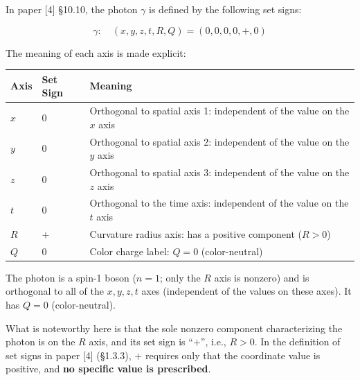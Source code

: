 \documentclass[
  a4paper,11pt]{article}
\newcounter{none}
\theoremstyle{definition}
\theoremstyle{remark}
\begin{document}
In paper {[}4{]} §10.10, the photon \(\gamma\) is defined by the
following set signs:

\[\gamma: \quad (x, y, z, t, R, Q) = (0, 0, 0, 0, +, 0)\]

The meaning of each axis is made explicit:

{\def\LTcaptype{none} %
\begin{longtable}[]{@{}
  >{\centering\arraybackslash}p{}
  >{\centering\arraybackslash}p{}
  >{\raggedright\arraybackslash}p{}@{}}
\toprule\noalign{}
\begin{minipage}[b]{\linewidth}\centering
Axis
\end{minipage} & \begin{minipage}[b]{\linewidth}\centering
Set Sign
\end{minipage} & \begin{minipage}[b]{\linewidth}\raggedright
Meaning
\end{minipage} \\
\midrule\noalign{}
\endhead
\bottomrule\noalign{}
\endlastfoot
\(x\) & \(0\) & Orthogonal to spatial axis 1: independent of the value
on the \(x\) axis \\
\(y\) & \(0\) & Orthogonal to spatial axis 2: independent of the value
on the \(y\) axis \\
\(z\) & \(0\) & Orthogonal to spatial axis 3: independent of the value
on the \(z\) axis \\
\(t\) & \(0\) & Orthogonal to the time axis: independent of the value on
the \(t\) axis \\
\(R\) & \(+\) & Curvature radius axis: has a positive component
(\(R > 0\)) \\
\(Q\) & \(0\) & Color charge label: \(Q = 0\) (color-neutral) \\
\end{longtable}
}

The photon is a spin-1 boson (\(n = 1\); only the \(R\) axis is nonzero)
and is orthogonal to all of the \(x, y, z, t\) axes (independent of the
values on these axes). It has \(Q = 0\) (color-neutral).

What is noteworthy here is that the sole nonzero component
characterizing the photon is on the \(R\) axis, and its set sign is
``\(+\)'', i.e., \(R > 0\). In the definition of set signs in paper
{[}4{]} (§1.3.3), \(+\) requires only that the coordinate value is
positive, and \textbf{no specific value is prescribed}.
\end{document}
